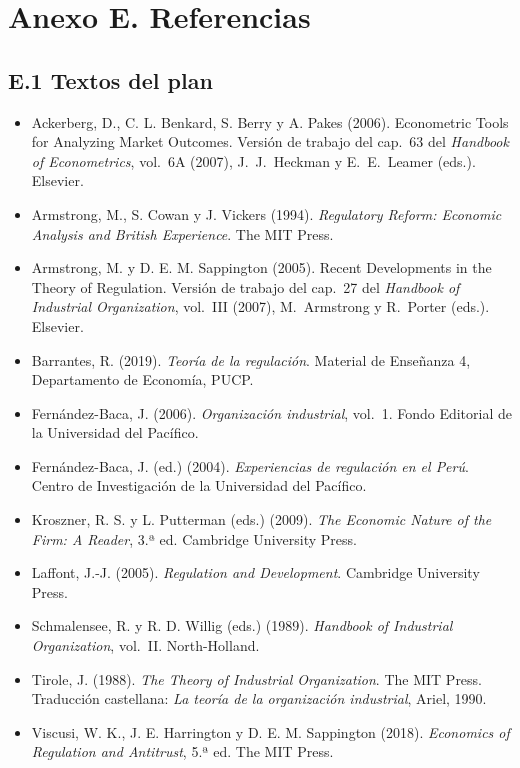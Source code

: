 \documentclass[11pt,a4paper]{article}
\begin{document}
\section*{Anexo E. Referencias}

\subsection*{E.1 Textos del plan}
{\small
\begin{itemize}[leftmargin=1.4em,itemsep=1pt,label={}]
\item Ackerberg, D., C. L. Benkard, S. Berry y A. Pakes (2006). Econometric Tools for Analyzing Market Outcomes. Versión de trabajo del cap.~63 del \emph{Handbook of Econometrics}, vol.~6A (2007), J.~J.~Heckman y E.~E.~Leamer (eds.). Elsevier.
\item Armstrong, M., S. Cowan y J. Vickers (1994). \emph{Regulatory Reform: Economic Analysis and British Experience}. The MIT Press.
\item Armstrong, M. y D. E. M. Sappington (2005). Recent Developments in the Theory of Regulation. Versión de trabajo del cap.~27 del \emph{Handbook of Industrial Organization}, vol.~III (2007), M.~Armstrong y R.~Porter (eds.). Elsevier.
\item Barrantes, R. (2019). \emph{Teoría de la regulación}. Material de Enseñanza 4, Departamento de Economía, PUCP.
\item Fernández-Baca, J. (2006). \emph{Organización industrial}, vol.~1. Fondo Editorial de la Universidad del Pacífico.
\item Fernández-Baca, J. (ed.) (2004). \emph{Experiencias de regulación en el Perú}. Centro de Investigación de la Universidad del Pacífico.
\item Kroszner, R. S. y L. Putterman (eds.) (2009). \emph{The Economic Nature of the Firm: A Reader}, 3.ª ed. Cambridge University Press.
\item Laffont, J.-J. (2005). \emph{Regulation and Development}. Cambridge University Press.
\item Schmalensee, R. y R. D. Willig (eds.) (1989). \emph{Handbook of Industrial Organization}, vol.~II. North-Holland.
\item Tirole, J. (1988). \emph{The Theory of Industrial Organization}. The MIT Press. Traducción castellana: \emph{La teoría de la organización industrial}, Ariel, 1990.
\item Viscusi, W. K., J. E. Harrington y D. E. M. Sappington (2018). \emph{Economics of Regulation and Antitrust}, 5.ª ed. The MIT Press.
\end{itemize}
}
\end{document}

